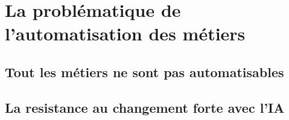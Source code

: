 \newpage
\section{La problématique de l'automatisation des métiers}

\subsection*{Tout les métiers ne sont pas automatisables}
\subsection*{La resistance au changement forte avec l'IA}
